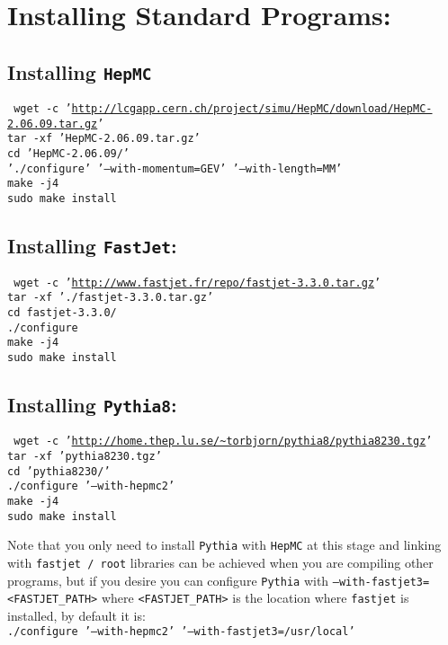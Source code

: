 \section{Installing Standard Programs:}

\subsection{Installing {\tt HepMC}}
{\tt
wget -c '\url{http://lcgapp.cern.ch/project/simu/HepMC/download/HepMC-2.06.09.tar.gz}'\\
tar -xf 'HepMC-2.06.09.tar.gz'\\
cd 'HepMC-2.06.09/'\\
'./configure' '--with-momentum=GEV' '--with-length=MM'\\
make -j4\\
sudo make install\\
}

\subsection{Installing {\tt FastJet}:}
{\tt
wget -c '\url{http://www.fastjet.fr/repo/fastjet-3.3.0.tar.gz}'\\
tar -xf './fastjet-3.3.0.tar.gz'\\
cd fastjet-3.3.0/\\
./configure\\
make -j4\\
sudo make install\\
}

\subsection{Installing {\tt Pythia8}:}
{\tt
wget -c '\url{http://home.thep.lu.se/~torbjorn/pythia8/pythia8230.tgz}'\\
tar -xf 'pythia8230.tgz'\\
cd 'pythia8230/'\\
./configure '--with-hepmc2'\\
make -j4\\
sudo make install\\
}

Note that you only need to install {\tt Pythia} with {\tt HepMC} at this stage and linking with {\tt fastjet / root} libraries can be achieved when you are compiling other programs, but if you desire you can configure {\tt Pythia} with {\tt --with-fastjet3=<FASTJET\_PATH>} where {\tt <FASTJET\_PATH>} is the location where {\tt fastjet} is installed, by default it is:\\
{\tt ./configure '--with-hepmc2' '--with-fastjet3=/usr/local'}

